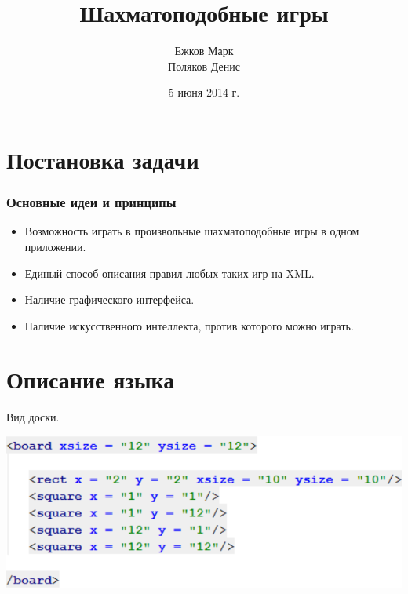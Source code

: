 \documentclass[11pt,slides,aspectratio=43]{beamer}
\title[]{Шахматоподобные игры}
\author[Ежков М. Поляков Д.]{Ежков Марк \\Поляков Денис}
\date{5 июня 2014 г.}
\begin{document}
	\begin{frame}
		\maketitle
	\end{frame}
	
	\section{Постановка задачи}	
	
	\begin{frame}
	\frametitle{Основные идеи и принципы}
	   \begin{block}{}
            \begin{itemize}
	           \item Возможность играть в произвольные шахматоподобные игры в одном приложении.
	           \item Единый способ описания правил любых таких игр на XML.
               \item Наличие графического интерфейса.
               \item Наличие искусственного интеллекта, против которого можно играть.
            \end{itemize}
		\end{block}
	\end{frame}
	
	\section{Описание языка}%
	
	\begin{frame}{Вид доски.}
		\begin{block}{}
		    \begin{center}
				\includegraphics[scale=0.5]{descr.png}
			\end{center}
		\end{block}
	\end{frame}
		
\end{document}
